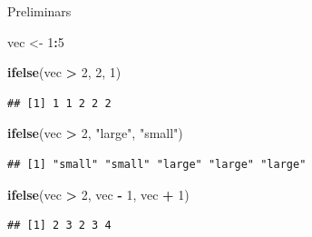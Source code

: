 \documentclass[ignorenonframetext,]{beamer}
\newenvironment{Shaded}{\begin{snugshade}}{\end{snugshade}}
\newcommand{\DecValTok}[1]{\textcolor[rgb]{0.00,0.00,0.81}{#1}}
\newcommand{\KeywordTok}[1]{\textcolor[rgb]{0.13,0.29,0.53}{\textbf{#1}}}
\newcommand{\NormalTok}[1]{#1}
\newcommand{\OperatorTok}[1]{\textcolor[rgb]{0.81,0.36,0.00}{\textbf{#1}}}
\newcommand{\StringTok}[1]{\textcolor[rgb]{0.31,0.60,0.02}{#1}}
\begin{document}
\begin{frame}[fragile]{Preliminars}
\protect\hypertarget{preliminars-1}{}

\begin{Shaded}
\begin{Highlighting}[]
\NormalTok{vec <-}\StringTok{ }\DecValTok{1}\OperatorTok{:}\DecValTok{5}
\end{Highlighting}
\end{Shaded}

\begin{Shaded}
\begin{Highlighting}[]
\KeywordTok{ifelse}\NormalTok{(vec }\OperatorTok{>}\StringTok{ }\DecValTok{2}\NormalTok{, }\DecValTok{2}\NormalTok{, }\DecValTok{1}\NormalTok{)}
\end{Highlighting}
\end{Shaded}

\begin{verbatim}
## [1] 1 1 2 2 2
\end{verbatim}

\begin{Shaded}
\begin{Highlighting}[]
\KeywordTok{ifelse}\NormalTok{(vec }\OperatorTok{>}\StringTok{ }\DecValTok{2}\NormalTok{, }\StringTok{"large"}\NormalTok{, }\StringTok{"small"}\NormalTok{)}
\end{Highlighting}
\end{Shaded}

\begin{verbatim}
## [1] "small" "small" "large" "large" "large"
\end{verbatim}

\begin{Shaded}
\begin{Highlighting}[]
\KeywordTok{ifelse}\NormalTok{(vec }\OperatorTok{>}\StringTok{ }\DecValTok{2}\NormalTok{, vec }\OperatorTok{-}\StringTok{ }\DecValTok{1}\NormalTok{, vec }\OperatorTok{+}\StringTok{ }\DecValTok{1}\NormalTok{)}
\end{Highlighting}
\end{Shaded}

\begin{verbatim}
## [1] 2 3 2 3 4
\end{verbatim}

\end{frame}
\end{document}

